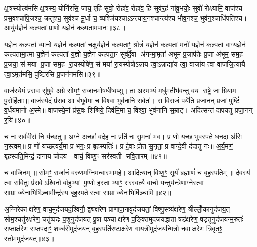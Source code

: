{\anuvakamend[{स्क॒भ्नी॒त॒ यु॒य॒व॒न्पि॒तरा॒ द्विच॑त्वारिशच्च॥८॥}]}

क्ष॒त्रस्योल्ब॑मसि क्ष॒त्रस्य॒ योनि॑रसि॒ जाय॒ एहि॒ सुवो॒ रोहा॑व॒ रोहा॑व॒ हि सुव॑र॒हं ना॑वु॒भयोः॒ सुवो॑ रोक्ष्यामि॒ वाज॑श्च प्रस॒वश्चा॑पि॒जश्च॒ क्रतु॑श्च॒ सुव॑श्च मू॒र्धा च॒ व्यश्ञि॑यश्चाऽऽन्त्याय॒नश्चान्त्य॑श्च भौव॒नश्च॒ भुव॑न॒श्चाधि॑पतिश्च। आयु॑र्य॒ज्ञेन॑ कल्पतां प्रा॒णो य॒ज्ञेन॑ कल्पतामपा॒नः॥३८॥

य॒ज्ञेन॑ कल्पतां व्या॒नो य॒ज्ञेन॑ कल्पतां॒ चक्षु॑र्य॒ज्ञेन॑ कल्पता॒ꣳ॒ श्रोत्रं॑ य॒ज्ञेन॑ कल्पतां॒ मनो॑ य॒ज्ञेन॑ कल्पतां॒ वाग्य॒ज्ञेन॑ कल्पतामा॒त्मा य॒ज्ञेन॑ कल्पतां य॒ज्ञो य॒ज्ञेन॑ कल्पता॒ꣳ॒ सुव॑र्दे॒वा अ॑गन्मा॒मृता॑ अभूम प्र॒जाप॑तेः प्र॒जा अ॑भूम॒ सम॒हं प्र॒जया॒ सं मया प्र॒जा सम॒ह रा॒यस्पोषे॑ण॒ सं मया॑ रा॒यस्पोषोऽन्ना॑य त्वा॒ऽन्नाद्या॑य त्वा॒ वाजा॑य त्वा वाजजि॒त्यायै त्वा॒ऽमृत॑मसि॒ पुष्टि॑रसि प्र॒जन॑नमसि॥३९॥

{\anuvakamend[{अ॒पा॒नो वाजा॑य॒ नव॑ च॥९॥}]}

वाज॑स्ये॒मं प्र॑स॒वः सु॑षुवे॒ अग्रे॒ सोम॒ꣳ॒ राजा॑न॒मोष॑धीष्व॒प्सु। ता अ॒स्मभ्यं॒ मधु॑मतीर्भवन्तु व॒य रा॒ष्ट्रे जाग्रियाम पु॒रोहि॑ताः॥ वाज॑स्ये॒दं प्र॑स॒व आ ब॑भूवे॒मा च॒ विश्वा॒ भुव॑नानि स॒र्वतः॑। स वि॒राजं॒ पर्ये॑ति प्रजा॒नन् प्र॒जां पुष्टिं॑ व॒र्धय॑मानो अ॒स्मे॥ वाज॑स्ये॒मां प्र॑स॒वः शि॑श्रिये॒ दिव॑मि॒मा च॒ विश्वा॒ भुव॑नानि स॒म्राट्। अदि॑त्सन्तं दापयतु प्रजा॒नन् र॒यिं॥४०॥

च॒ नः॒ सर्व॑वीरां॒ नि य॑च्छतु॥ अग्ने॒ अच्छा॑ वदे॒ह नः॒ प्रति॑ नः सु॒मना॑ भव। प्र णो॑ यच्छ भुवस्पते धन॒दा अ॑सि न॒स्त्वम्॥ प्र णो॑ यच्छत्वर्य॒मा प्र भगः॒ प्र बृह॒स्पतिः॑। प्र दे॒वाः प्रोत सू॒नृता॒ प्र वाग्दे॒वी द॑दातु नः॥ अ॒र्य॒मणं॒ बृह॒स्पति॒मिन्द्रं॒ दाना॑य चोदय। वाचं॒ विष्णु॒ꣳ॒ सर॑स्वती सवि॒तारम्॥४१॥

च॒ वा॒जिनम्॥ सोम॒ꣳ॒ राजा॑नं॒ वरु॑णम॒ग्निम॒न्वार॑भामहे। आ॒दि॒त्यान् विष्णु॒ꣳ॒ सूर्यं॑ ब्र॒ह्माणं॑ च॒ बृह॒स्पतिम्॥ दे॒वस्य॑ त्वा सवि॒तुः प्र॑स॒वेऽश्विनोर्बा॒हुभ्यां पू॒ष्णो हस्ताभ्या॒ꣳ॒ सर॑स्वत्यै वा॒चो य॒न्तुर्य॒न्त्रेणा॒ग्नेस्त्वा॒ साम्राज्येना॒भिषि॑ञ्चा॒मीन्द्र॑स्य॒ बृह॒स्पतेस्त्वा॒ साम्राज्येना॒भिषि॑ञ्चामि॥४२॥

{\anuvakamend[{र॒यि स॑वि॒तार॒ꣳ॒ षट्त्रिꣳ॑शच्च॥10॥}]}

अ॒ग्निरेकाक्षरेण॒ वाच॒मुद॑जयद॒श्विनौ॒ द्व्य॑क्षरेण प्राणापा॒नावुद॑जयतां॒ विष्णु॒स्त्र्य॑क्षरेण॒ त्रील्लोँ॒कानुद॑जय॒त् सोम॒श्चतु॑रक्षरेण॒ चतु॑ष्पदः प॒शूनुद॑जयत् पू॒षा पञ्चाक्षरेण प॒ङ्क्तिमुद॑जयद्धा॒ता षड॑क्षरेण॒ षडृ॒तूनुद॑जयन्म॒रुतः॑ स॒प्ताक्ष॑रेण स॒प्तप॑दा॒ꣳ॒ शक्व॑री॒मुद॑जय॒न् बृह॒स्पति॑र॒ष्टाक्ष॑रेण गाय॒त्रीमुद॑जयन्मि॒त्रो नवाक्षरेण त्रि॒वृत॒ꣵ॒ स्तोम॒मुद॑जयत्॥४३॥


